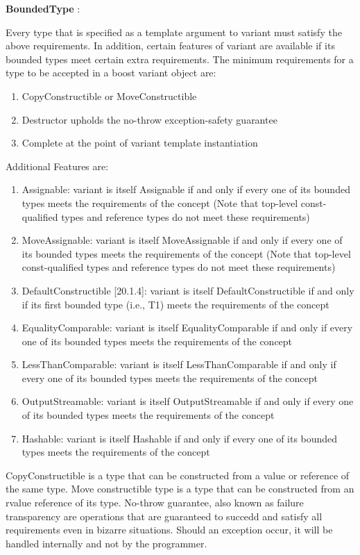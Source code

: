 \documentclass[letterpaper, 12pt]{article}
\begin{document}
{\bfseries BoundedType} :
\par\vspace{\baselineskip}
Every type that is specified as a template argument to variant must satisfy the above requirements. In addition, certain
features of variant are available if its bounded types meet certain extra requirements. The minimum requirements for a type to be accepted in a boost variant object are:
\begin{enumerate}
 \item CopyConstructible or MoveConstructible
 \item Destructor upholds the no-throw exception-safety guarantee
 \item Complete at the point of variant template instantiation
\end{enumerate}

Additional Features are:
\begin{enumerate}
 \item Assignable: variant is itself Assignable if and only if every one of its bounded
 types meets the requirements of the concept (Note that top-level const-qualified
 types and reference types do not meet these requirements)
 \item MoveAssignable: variant is itself MoveAssignable if and only if every one of its
 bounded types meets the requirements of the concept (Note that top-level const-qualified
 types and reference types do not meet these requirements)
 \item DefaultConstructible [20.1.4]: variant is itself DefaultConstructible if and only
 if its first bounded type (i.e., T1) meets the requirements of the concept
 \item EqualityComparable: variant is itself EqualityComparable if and only if every one
 of its bounded types meets the requirements of the concept
 \item LessThanComparable: variant is itself LessThanComparable if and only if every one
 of its bounded types meets the requirements of the concept
 \item OutputStreamable: variant is itself OutputStreamable if and only if every one of
 its bounded types meets the requirements of the concept
 \item Hashable: variant is itself Hashable if and only if every one of its bounded types
 meets the requirements of the concept
\end{enumerate}

CopyConstructible is a type that can be constructed from a value or reference of the same
type. Move constructible type is a type that can be constructed from an rvalue reference of its type.
No-throw guarantee, also known as failure transparency are operations that are guaranteed to
succedd and satisfy all requirements even in bizarre situations. Should an exception
occur, it will be handled internally and not by the programmer.
\par\vspace{\baselineskip}
\end{document}
